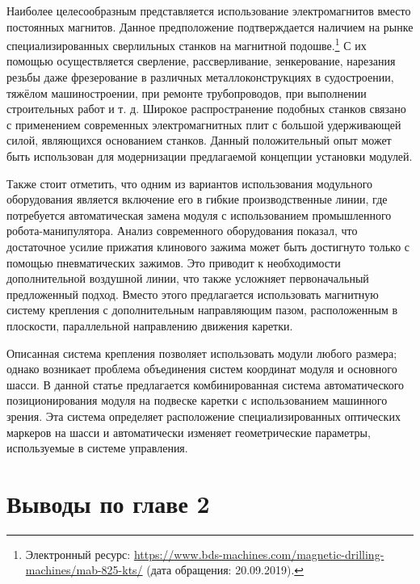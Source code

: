 Наиболее целесообразным представляется использование электромагнитов вместо постоянных магнитов. Данное предположение подтверждается наличием на рынке специализированных сверлильных станков на магнитной подошве.\footnote{Электронный ресурс: {\tiny\url{https://www.bds-machines.com/magnetic-drilling-machines/mab-825-kts/}} (дата обращения: 20.09.2019).} С их помощью осуществляется сверление, рассверливание, зенкерование, нарезания резьбы даже фрезерование в различных металлоконструкциях в судостроении, тяжёлом машиностроении, при ремонте трубопроводов, при выполнении строительных работ и т. д. Широкое распространение подобных станков связано с применением современных электромагнитных плит с большой удерживающей силой, являющихся основанием станков. Данный положительный опыт может быть использован для модернизации предлагаемой концепции установки модулей.

Также стоит отметить, что одним из вариантов использования модульного оборудования является включение его в гибкие производственные линии, где потребуется автоматическая замена модуля с использованием промышленного робота-манипулятора. Анализ современного оборудования показал, что достаточное усилие прижатия клинового зажима может быть достигнуто только с помощью пневматических зажимов. Это приводит к необходимости дополнительной воздушной линии, что также усложняет первоначальный предложенный подход. Вместо этого предлагается использовать магнитную систему крепления с дополнительным направляющим пазом, расположенным в плоскости, параллельной направлению движения каретки.

Описанная система крепления позволяет использовать модули любого размера; однако возникает проблема объединения систем координат модуля и основного шасси. В данной статье предлагается комбинированная система автоматического позиционирования модуля на подвеске каретки с использованием машинного зрения. Эта система определяет расположение специализированных оптических маркеров на шасси и автоматически изменяет геометрические параметры, используемые в системе управления.

\section{Выводы по главе 2}


\FloatBarrier